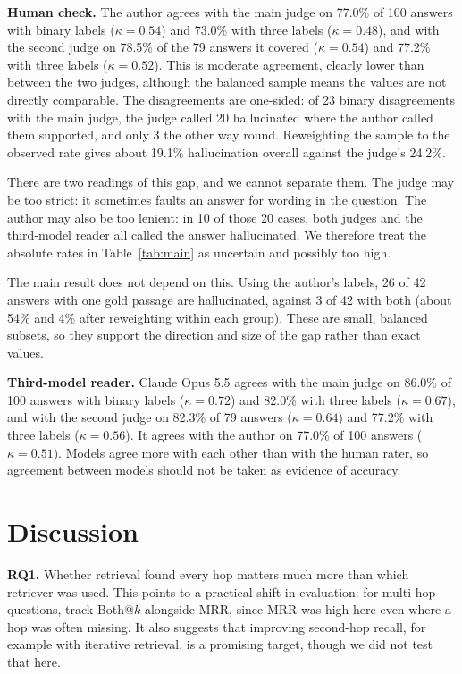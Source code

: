 \documentclass[10pt,a4paper,twocolumn]{article}
\begin{document}
\textbf{Human check.} The author agrees with the main judge on 77.0\% of 100 answers with binary labels ($\kappa=0.54$) and 73.0\% with three labels ($\kappa=0.48$), and with the second judge on 78.5\% of the 79 answers it covered ($\kappa=0.54$) and 77.2\% with three labels ($\kappa=0.52$). This is moderate agreement, clearly lower than between the two judges, although the balanced sample means the values are not directly comparable. The disagreements are one-sided: of 23 binary disagreements with the main judge, the judge called 20 hallucinated where the author called them supported, and only 3 the other way round. Reweighting the sample to the observed rate gives about 19.1\% hallucination overall against the judge's 24.2\%.

There are two readings of this gap, and we cannot separate them. The judge may be too strict: it sometimes faults an answer for wording in the question. The author may also be too lenient: in 10 of those 20 cases, both judges and the third-model reader all called the answer hallucinated. We therefore treat the absolute rates in Table~\ref{tab:main} as uncertain and possibly too high.

The main result does not depend on this. Using the author's labels, 26 of 42 answers with one gold passage are hallucinated, against 3 of 42 with both (about 54\% and 4\% after reweighting within each group). These are small, balanced subsets, so they support the direction and size of the gap rather than exact values.

\textbf{Third-model reader.} Claude Opus 5.5 agrees with the main judge on 86.0\% of 100 answers with binary labels ($\kappa=0.72$) and 82.0\% with three labels ($\kappa=0.67$), and with the second judge on 82.3\% of 79 answers ($\kappa=0.64$) and 77.2\% with three labels ($\kappa=0.56$). It agrees with the author on 77.0\% of 100 answers ($\kappa=0.51$). Models agree more with each other than with the human rater, so agreement between models should not be taken as evidence of accuracy.

\section{Discussion}

\textbf{RQ1.} Whether retrieval found every hop matters much more than which retriever was used. This points to a practical shift in evaluation: for multi-hop questions, track Both@$k$ alongside
MRR, since MRR was high here even where a hop was often missing. It also suggests that improving second-hop recall, for example with iterative retrieval, is a promising target, though we did not test that here.
\end{document}
